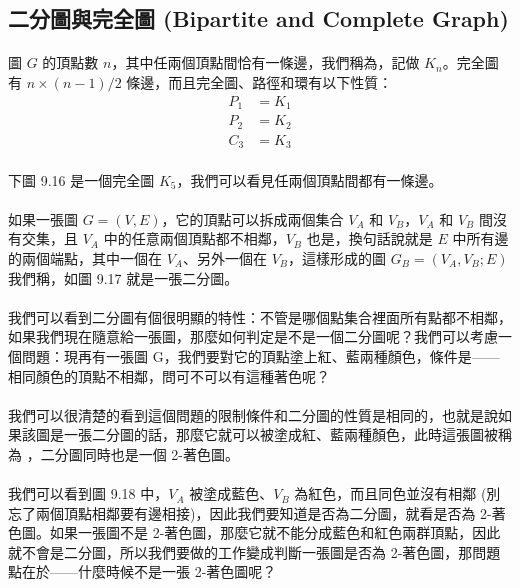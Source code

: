 \documentclass[12pt,a4paper,oneside]{report}
\begin{document}
\begin{CJK}{UTF8}{bkai}
\subsection{二分圖與完全圖 (Bipartite and Complete Graph)}
\paragraph{}圖 $G$ 的頂點數 $n$，其中任兩個頂點間恰有一條邊，我們稱為，記做 $K_n$。完全圖有 $n\times{(n-1)}/2$ 條邊，而且完全圖、路徑和環有以下性質：
\begin{align}
\label{eq:complete_graph}
P_1&=K_1\\
P_2&=K_2\\
C_3&=K_3
\end{align}
\paragraph{}下圖 9.16 是一個完全圖 $K_5$，我們可以看見任兩個頂點間都有一條邊。
\paragraph{}如果一張圖 $G=(V,E)$，它的頂點可以拆成兩個集合 $V_A$ 和 $V_B$，$V_A$ 和 $V_B$ 間沒有交集，且 $V_A$ 中的任意兩個頂點都不相鄰，$V_B$ 也是，換句話說就是 $E$ 中所有邊的兩個端點，其中一個在 $V_A$、另外一個在 $V_B$，這樣形成的圖 $G_B=(V_A,V_B;E)$ 我們稱\textbf{}，如圖 9.17 就是一張二分圖。
\paragraph{}我們可以看到二分圖有個很明顯的特性：不管是哪個點集合裡面所有點都不相鄰，如果我們現在隨意給一張圖，那麼如何判定是不是一個二分圖呢？我們可以考慮一個問題：現再有一張圖 G，我們要對它的頂點塗上紅、藍兩種顏色，條件是------相同顏色的頂點不相鄰，問可不可以有這種著色呢？
\paragraph{}我們可以很清楚的看到這個問題的限制條件和二分圖的性質是相同的，也就是說如果該圖是一張二分圖的話，那麼它就可以被塗成紅、藍兩種顏色，此時這張圖被稱為 \textbf{}，二分圖同時也是一個 2-著色圖。
\paragraph{}我們可以看到圖 9.18 中，$V_A$ 被塗成藍色、$V_B$ 為紅色，而且同色並沒有相鄰 (別忘了兩個頂點相鄰要有邊相接)，因此我們要知道是否為二分圖，就看是否為 2-著色圖。如果一張圖不是 2-著色圖，那麼它就不能分成藍色和紅色兩群頂點，因此就不會是二分圖，所以我們要做的工作變成判斷一張圖是否為 2-著色圖，那問題點在於------什麼時候不是一張 2-著色圖呢？

\end{CJK}
\end{document}
